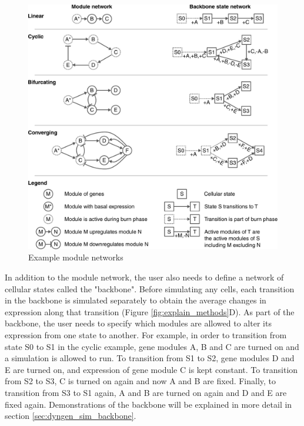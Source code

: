 
\begin{figure}[htb!]
	\centering
	\includegraphics[width=\LARGEfigure]{fig/example_backbones} 
	\caption{Example module networks}
	\label{fig:example_backbones}
\end{figure}

In addition to the module network, the user also needs to define a network of cellular states called the "backbone". Before simulating any cells, each transition in the backbone is simulated separately to obtain the average changes in expression along that transition (Figure \ref{fig:explain_methods}D). As part of the backbone, the user needs to specify which modules are allowed to alter its expression from one state to another. For example, in order to transition from state S0 to S1 in the cyclic example, gene modules A, B and C are turned on and a simulation is allowed to run. To transition from S1 to S2, gene modules D and E are turned on, and expression of gene module C is kept constant. To transition from S2 to S3, C is turned on again and now A and B are fixed. Finally, to transition from S3 to S1 again, A and B are turned on again and D and E are fixed again. Demonstrations of the backbone will be explained in more detail in section \ref{sec:dyngen_sim_backbone}.

